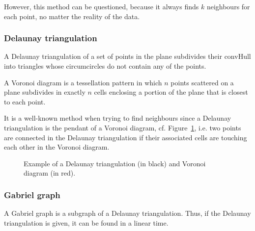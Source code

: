 \documentclass[lettersize,journal,english]{IEEEtran}
\begin{document}
            However, this method can be questioned, because it always finds $k$ neighbours for each point, no matter the reality of the data.

        \subsubsection{Delaunay triangulation}
            A Delaunay triangulation \cite{art_delaunay} of a set of points in the plane subdivides their \gls{convHull} into triangles whose circumcircles do not contain any of the points.

            A Voronoi diagram is a tessellation pattern in which $n$ points scattered on a plane subdivides in exactly $n$ cells enclosing a portion of the plane that is closest to each point. 

            It is a well-known method when trying to find neighbours \cite{delaunay_neighbor} since a Delaunay triangulation is the pendant of a Voronoi diagram, cf. Figure~\ref{fig:del_tri}, i.e. two points are connected in the
            Delaunay triangulation if their associated cells are touching each other in the Voronoi diagram.

            \begin{figure}
                \centering
                \caption{Example of a Delaunay triangulation (in black) and Voronoi diagram (in red).}
                \label{fig:del_tri}
            \end{figure}

        \subsubsection{Gabriel graph}
            A Gabriel graph \cite{10.2307/2412323} is a subgraph of a Delaunay triangulation. Thus, if the Delaunay triangulation is given, it can be found in a linear time. 
\end{document}
